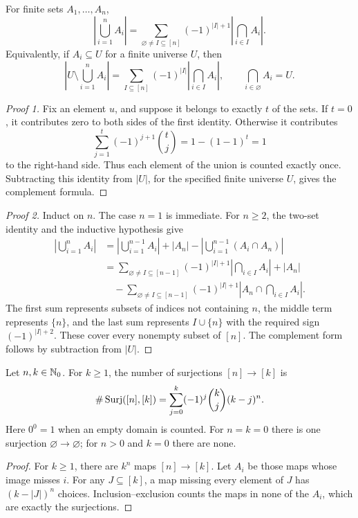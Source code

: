 \documentclass[11pt, oneside]{article}
\begin{document}
\begin{theorem}\label{thm:ie}
For finite sets $A_1, \ldots, A_n$,
\[
\left|\bigcup_{i=1}^n A_i\right|=
\sum_{\varnothing\ne I\subseteq[n]}(-1)^{|I|+1}
\left|\bigcap_{i\in I}A_i\right|.
\]
Equivalently, if $A_i\subseteq U$ for a finite universe $U$, then
\[
\left|U\setminus\bigcup_{i=1}^nA_i\right|=
\sum_{I\subseteq[n]}(-1)^{|I|}\left|\bigcap_{i\in I}A_i\right|,
\qquad\bigcap_{i\in\varnothing}A_i=U.
\]
\end{theorem}
\begin{proof}[Proof 1]
Fix an element $u$, and suppose it belongs to exactly $t$ of the sets. If $t=0$, it contributes zero to both sides of the first identity. Otherwise it contributes
\[
\sum_{j=1}^t(-1)^{j+1}\binom tj=1-(1-1)^t=1
\]
to the right-hand side. Thus each element of the union is counted exactly once. Subtracting this identity from $|U|$, for the specified finite universe $U$, gives the complement formula.
\end{proof}
\begin{proof}[Proof 2]
Induct on $n$. The case $n=1$ is immediate. For $n\ge2$, the two-set identity and the inductive hypothesis give
\[
\begin{aligned}
\left|\bigcup_{i=1}^n A_i\right|
&=\left|\bigcup_{i=1}^{n-1}A_i\right|+|A_n|
-\left|\bigcup_{i=1}^{n-1}(A_i\cap A_n)\right|\\
&=\sum_{\varnothing\ne I\subseteq[n-1]}(-1)^{|I|+1}
\left|\bigcap_{i\in I}A_i\right|+|A_n|\\
&\quad-\sum_{\varnothing\ne I\subseteq[n-1]}(-1)^{|I|+1}
\left|A_n\cap\bigcap_{i\in I}A_i\right|.
\end{aligned}
\]
The first sum represents subsets of indices not containing $n$, the middle term represents $\{n\}$, and the last sum represents $I\cup\{n\}$ with the required sign $(-1)^{|I|+2}$. These cover every nonempty subset of $[n]$. The complement form follows by subtraction from $|U|$.
\end{proof}

\begin{proposition}\label{prop:surj}
Let $n, k\in\mathbb{N}_0$. For $k\ge1$, the number of surjections $[n]\to[k]$ is
\[
\#\operatorname{Surj}([n], [k])=\sum_{j=0}^k(-1)^j\binom kj(k-j)^n.
\]
Here $0^0=1$ when an empty domain is counted. For $n=k=0$ there is one surjection $\varnothing\to\varnothing$; for $n>0$ and $k=0$ there are none.
\end{proposition}
\begin{proof}
For $k\ge1$, there are $k^n$ maps $[n]\to[k]$. Let $A_i$ be those maps whose image misses $i$. For any $J\subseteq[k]$, a map missing every element of $J$ has $(k-|J|)^n$ choices. Inclusion--exclusion counts the maps in none of the $A_i$, which are exactly the surjections.
\end{proof}
\end{document}
